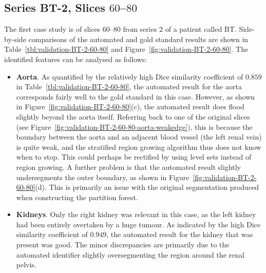 \subsection{Series BT-2, Slices $60$--$80$}

The first case study is of slices $60$--$80$ from series $2$ of a patient called BT. Side-by-side comparisons of the automated and gold standard results are shown in Table~\ref{tbl:validation-BT-2-60-80} and Figure~\ref{fig:validation-BT-2-60-80}. The identified features can be analysed as follows:
%
\begin{itemize}

\item \textbf{Aorta}. As quantified by the relatively high Dice similarity coefficient of $0.859$ in Table~\ref{tbl:validation-BT-2-60-80}, the automated result for the aorta corresponds fairly well to the gold standard in this case. However, as shown in Figure~\ref{fig:validation-BT-2-60-80}(c), the automated result does flood slightly beyond the aorta itself. Referring back to one of the original slices (see Figure~\ref{fig:validation-BT-2-60-80-aorta-weakedge}), this is because the boundary between the aorta and an adjacent blood vessel (the left renal vein) is quite weak, and the stratified region growing algorithm thus does not know when to stop. This could perhaps be rectified by using level sets instead of region growing. A further problem is that the automated result slightly undersegments the outer boundary, as shown in Figure~\ref{fig:validation-BT-2-60-80}(d). This is primarily an issue with the original segmentation produced when constructing the partition forest.

\item \textbf{Kidneys}. Only the right kidney was relevant in this case, as the left kidney had been entirely overtaken by a huge tumour. As indicated by the high Dice similarity coefficient of $0.949$, the automated result for the kidney that was present was good. The minor discrepancies are primarily due to the automated identifier slightly oversegmenting the region around the renal pelvis.


\end{itemize}
